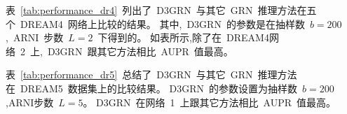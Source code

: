 表~\ref{tab:performance_dr4}~列出了~D3GRN~与其它~GRN~推理方法在五个~DREAM4~网络上比较的结果。
其中,~D3GRN~的参数是在抽样数~$b=200$,~ARNI~步数~$L=2$~下得到的。
如表所示,除了在~DREAM4网络~2~上,~D3GRN~跟其它方法相比~AUPR~值最高。

表~\ref{tab:performance_dr5}~总结了~D3GRN~与其它~GRN~推理方法在~DREAM5~数据集上的比较结果。
D3GRN~的参数设置为抽样数~$b=200$,ARNI步数~$L=5$。
D3GRN~在网络~1~上跟其它方法相比~AUPR~值最高。


